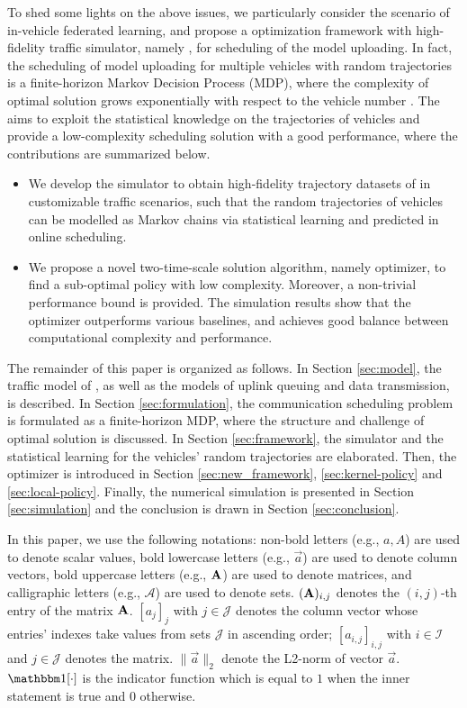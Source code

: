 To shed some lights on the above issues, we particularly consider the scenario of in-vehicle federated learning, and propose a optimization framework with high-fidelity traffic simulator, namely {\fwName}, for scheduling of the model uploading. In fact, the scheduling of model uploading for multiple vehicles with random trajectories is a finite-horizon Markov Decision Process (MDP), where the complexity of optimal solution grows exponentially with respect to the vehicle number \cite{mdp-cui,mdp-zhou}. The {\fwName} aims to exploit the statistical knowledge on the trajectories of vehicles and provide a low-complexity scheduling solution with a good performance, where the contributions are summarized below.
\begin{itemize}
    \item We develop the {\fwName} simulator to obtain high-fidelity trajectory datasets of {\IAVs} in customizable traffic scenarios, such that the random trajectories of vehicles can be modelled as Markov chains via statistical learning and predicted in online scheduling. 
    \item We propose a novel two-time-scale solution algorithm, namely {\fwName} optimizer, to find a sub-optimal policy with low complexity. Moreover, a non-trivial performance bound is provided. The simulation results show that the {\fwName} optimizer outperforms various baselines, and achieves good balance between computational complexity and performance.
\end{itemize}

The remainder of this paper is organized as follows.
In Section \ref{sec:model}, the traffic model of {\IAVs}, as well as the models of uplink queuing and data transmission, is described.
In Section \ref{sec:formulation}, the communication scheduling problem is formulated as a finite-horizon MDP, where the structure and challenge of optimal solution is discussed.
In Section \ref{sec:framework}, the {\fwName} simulator and the statistical learning for the vehicles' random trajectories are elaborated.
Then, the {\fwName} optimizer is introduced in Section \ref{sec:new_framework}, \ref{sec:kernel-policy} and \ref{sec:local-policy}.
Finally, the numerical simulation is presented in Section \ref{sec:simulation} and the conclusion is drawn in Section \ref{sec:conclusion}.

In this paper, we use the following notations:
non-bold letters (e.g., $a, A$) are used to denote scalar values,
bold lowercase letters (e.g., $\vec{a}$) are used to denote column vectors,
bold uppercase letters (e.g., $\mathbf{A}$) are used to denote matrices,
and calligraphic letters (e.g., $\mathcal{A}$) are used to denote sets.
$(\mathbf{A})_{i,j}$ denotes the $(i,j)$-th entry of the matrix $\mathbf{A}$.
$[a_{j}]_{j}$ with $j\in \mathcal{J}$ denotes the column vector whose entries' indexes take values from sets $\mathcal{J}$ in ascending order; $[a_{i,j}]_{i,j}$ with $i\in \mathcal{I}$ and  $j\in \mathcal{J}$ denotes the matrix.
$\|{\vec{a}}\|_2$ denote the L2-norm of vector $\vec{a}$.
$\indicator[\cdot]$ is the indicator function which is equal to $1$ when the inner statement is true and $0$ otherwise.
